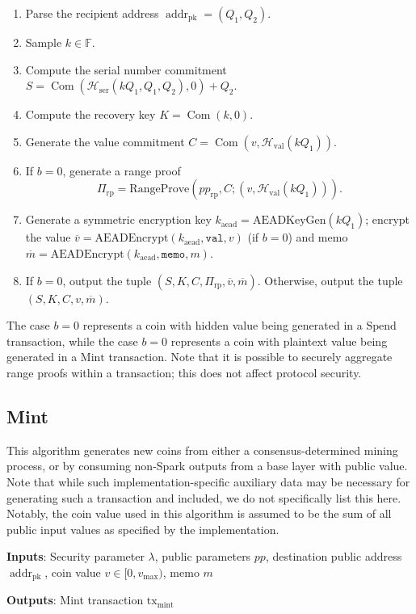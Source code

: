\documentclass{llncs}
\newcommand{\F}{\mathbb{F}}
\newcommand{\hash}{\mathcal{H}}
\newcommand{\addr}{\operatorname{addr}}
\newcommand{\com}{\operatorname{Com}}
\begin{document}
\begin{enumerate}
\item Parse the recipient address $\addr_{\text{pk}} = (Q_1, Q_2)$.
\item Sample $k \in \F$.
\item Compute the serial number commitment $S = \com(\hash_{\text{ser}}(kQ_1,Q_1,Q_2), 0) + Q_2$.
\item Compute the recovery key $K = \com(k, 0)$.
\item Generate the value commitment $C = \com(v,\hash_{\text{val}}(kQ_1))$.
\item If $b=0$, generate a range proof $$\Pi_{\text{rp}} = \text{RangeProve}(pp_{\text{rp}},C;(v,\hash_{\text{val}}(kQ_1))).$$
\item Generate a symmetric encryption key $k_{\text{aead}} = \text{AEADKeyGen}(kQ_1)$; encrypt the value $\overline{v} = \text{AEADEncrypt}(k_{\text{aead}},\texttt{val},v)$ (if $b=0$) and memo $\overline{m} = \text{AEADEncrypt}(k_{\text{aead}},\texttt{memo},m)$.
\item If $b=0$, output the tuple $(S, K, C, \Pi_{\text{rp}}, \overline{v}, \overline{m})$.
Otherwise, output the tuple $(S, K, C, v, \overline{m})$.
\end{enumerate}
The case $b=0$ represents a coin with hidden value being generated in a $\text{Spend}$ transaction, while the case $b=0$ represents a coin with plaintext value being generated in a $\text{Mint}$ transaction.
Note that it is possible to securely aggregate range proofs within a transaction; this does not affect protocol security.


\subsection{Mint}

This algorithm generates new coins from either a consensus-determined mining process, or by consuming non-Spark outputs from a base layer with public value.
Note that while such implementation-specific auxiliary data may be necessary for generating such a transaction and included, we do not specifically list this here.
Notably, the coin value used in this algorithm is assumed to be the sum of all public input values as specified by the implementation.

\textbf{Inputs}: Security parameter $\lambda$, public parameters $pp$, destination public address $\addr_{\text{pk}}$, coin value $v \in [0, v_{\text{max}})$, memo $m$

\textbf{Outputs}: Mint transaction $\text{tx}_{\text{mint}}$
\end{document}
